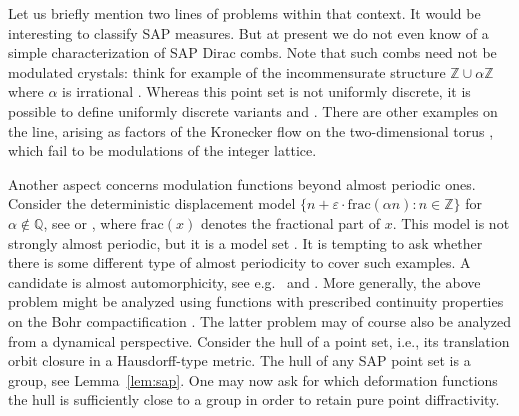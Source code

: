 \documentclass[11pt, a4wide]{amsart}
\numberwithin{lemma}{section}
\begin{document}
\smallskip


Let us briefly mention two lines of problems within that context.
It would be interesting to classify SAP measures. But at present we do not even know of a simple characterization of SAP Dirac combs. Note that such combs need not be modulated crystals: think for example of the incommensurate structure $\mathbb Z \cup \alpha\mathbb Z$ where $\alpha$ is irrational \cite[Ex.~9.6]{BG2}. Whereas this point set is not uniformly discrete, it is possible to define uniformly discrete variants \cite[Ex.~9.7]{BG2} and \cite[Ch.~4]{vS07}. There are other examples on the line, arising as factors of the Kronecker flow on the two-dimensional torus \cite[Sec.~6]{KL13}, which fail to be modulations of the integer lattice.


Another aspect concerns modulation functions beyond almost periodic ones. Consider  the deterministic displacement model $\{n+\varepsilon\cdot \mathrm{frac}(\alpha n): n\in\mathbb Z\}$ for $\alpha\notin \mathbb Q$, see \cite[Ex.~9.8]{BG2} or \cite[Sec.~6]{dB87}, where $\mathrm{frac}(x)$ denotes the fractional part of $x$. This model is not strongly almost periodic, but it is a model set \cite[Ex.~9.8]{BG2}.
It is tempting to ask whether there is some different type of almost periodicity to cover such examples. A candidate is almost automorphicity, see e.g.~\cite{V65} and \cite[Thm.~1]{KR}. More generally, the above problem might be analyzed using functions with prescribed continuity properties on the Bohr compactification \cite{Reich70}. The latter problem may of course also be analyzed from a dynamical perspective. Consider the hull of a point set, i.e., its translation orbit closure in a Hausdorff-type metric. The hull of any SAP point set is a group, see Lemma~\ref{lem:sap}.   One may now ask for which deformation functions  the hull is sufficiently close to a group in order to retain pure point diffractivity.

\smallskip
\end{document}
